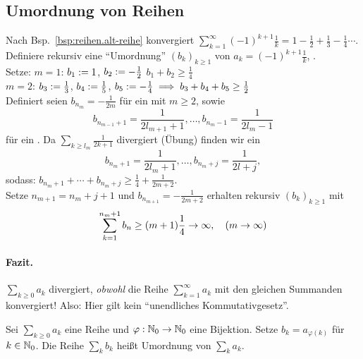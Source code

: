 \documentclass[12pt]{scrreprt}
\begin{document}
\subsection*{Umordnung von Reihen}
\begin{bsp}\label{bsp:reihen.umordn-altreihe}
Nach Bsp.~\ref{bsp:reihen.alt-reihe} konvergiert $\sum_{k=1}^\infty (-1)^{k+1} \frac{1}{k} = 1 - \frac{1}{2} + \frac{1}{3} - \frac{1}{4} \dotsb$.
Definiere rekursiv eine "`Umordnung"' $(b_k)_{k\ge 1}$ von $a_k = (-1)^{k+1}\frac{1}{k}$, .\\

\noindent Setze: $m = 1$: $b_1 := 1$, $b_2 := -\frac{1}{2}$ \folgt $b_1 + b_2 \ge \frac{1}{4}$\\
$m = 2$: $b_3 := \frac{1}{3}$, $b_4 := \frac{1}{5}$, $b_5 := -\frac{1}{4} \implies b_3 + b_4 + b_5 \ge \frac{1}{2}$\\

\noindent Definiert seien $b_{n_m} = -\frac{1}{2m}$ für ein  mit $m\ge 2$, sowie 
\[b_{n_{m-1}+1} = \frac{1}{2 l_{m+1} +1}, \dotsc, b_{n_{m}-1} = \frac{1}{2l_m -1}\] 
für ein . Da $\sum_{k\ge l_m} \frac{1}{2k+1}$ divergiert (Übung) finden wir ein 
\[b_{n_m +1} = \frac{1}{2l_m +1}, \dotsc, b_{n_m + j} = \frac{1}{2l+j},\] 
sodass: $b_{n_m+1} + \dotsb + b_{n_m + j} \ge \frac{1}{4} + \frac{1}{2m+2}.$\\

\noindent Setze $n_{m+1} = n_m + j +1$ und $b_{n_{m+1}} = -\frac{1}{2m+2}$
\folgt erhalten rekursiv $(b_k)_{k\ge 1}$ mit \[\sum_{k=1}^{n_m +1} b_n \ge (m+1)\frac{1}{4} \rightarrow \infty,\quad (m\rightarrow\infty)\]
\end{bsp}

\paragraph{Fazit.} $\sum_{k\ge 0}a_k$ divergiert, \emph{obwohl} die Reihe $\sum_{k=1}^\infty a_k$ mit
den gleichen Summanden konvergiert! Also: Hier gilt kein "`unendliches Kommutativgesetz"'.

\begin{dfn}\label{dfn:reihen.umordnung}
Sei $\sum_{k\ge 0}a_k$ eine Reihe und $\varphi: \mathbb{N}_0 \rightarrow \mathbb{N}_0$ 
eine Bijektion. Setze $b_k = a_{\varphi(k)}$ für $k \in \mathbb{N}_0$. Die Reihe $\sum_k b_k$
heißt Umordnung von $\sum_k a_k$.
\end{dfn}
\end{document}
